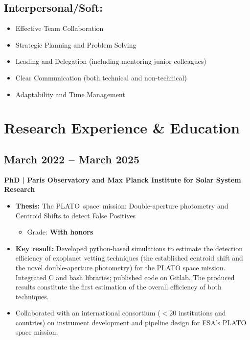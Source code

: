 \documentclass[11pt,a4paper]{article}
\begin{document}
\begin{multicols}{2}
		\subsection{Interpersonal/Soft:}
		
		\begin{itemize}
			\item Effective Team Collaboration
			\item Strategic Planning and Problem Solving
			\item Leading and Delegation (including mentoring junior colleagues)
			\item Clear Communication (both technical and non-technical)
			\item Adaptability and Time Management
		\end{itemize}
		
		
		\section{Research Experience \& Education}
		\subsection{March 2022 – March 2025}
		\textbf{PhD | Paris Observatory and Max Planck Institute for Solar System Research}
		\begin{itemize}
			\item \textbf{Thesis:} The \mbox{PLATO space mission:} Double-aperture photometry and Centroid Shifts to detect False Positives
			\begin{itemize}
				\item Grade: \textbf{With honors}
			\end{itemize}
			\item \textbf{Key result:} Developed python-based simulations to estimate the detection efficiency of exoplanet vetting techniques (the established centroid shift and the novel double-aperture photometry) for the PLATO space mission. Integrated C and bash libraries; published code on Gitlab. The produced results constitute the first estimation of the overall efficiency of both techniques.
			\item Collaborated with an international consortium ($<$20 institutions and countries) on instrument development and pipeline design for ESA's PLATO space mission.
		\end{itemize}
		

\end{multicols}
\end{document}
